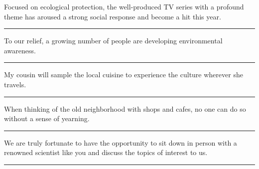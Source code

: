 \documentclass[11pt,a4paper]{article}
\newcommand{\num}[1]{\makebox[1.9em][r]{#1.}\hspace{0.3em}}
\newcommand{\wline}{\noindent\rule{\linewidth}{0.4pt}}
\begin{document}
\begin{minipage}{\linewidth}

\num{4}Focused on ecological protection, the well-produced TV series with a profound theme has aroused a strong social response and become a hit this year.

\vspace{0.25em}

\wline

\end{minipage}

\vspace{0.35em}\vspace{0.15em}

\begin{minipage}{\linewidth}

\num{5}To our relief, a growing number of people are developing environmental awareness.

\vspace{0.25em}

\wline

\end{minipage}

\begin{minipage}{\linewidth}

\num{6}My cousin will sample the local cuisine to experience the culture wherever she travels.

\vspace{0.25em}

\wline

\end{minipage}

\begin{minipage}{\linewidth}

\num{7}When thinking of the old neighborhood with shops and cafes, no one can do so without a sense of yearning.

\vspace{0.25em}

\wline

\end{minipage}

\begin{minipage}{\linewidth}

\num{8}We are truly fortunate to have the opportunity to sit down in person with a renowned scientist like you and discuss the topics of interest to us.

\vspace{0.25em}

\wline

\end{minipage}
\end{document}
